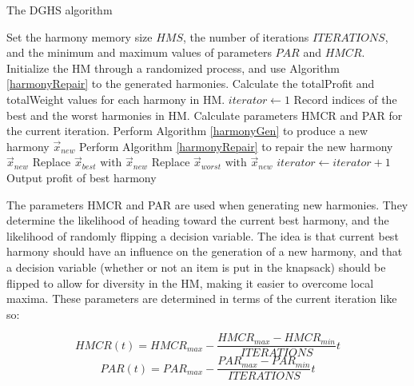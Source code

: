 \documentclass[titlepage]{article}
\begin{document}
\vskip 0.5cm
\begin{breakablealgorithm}
\caption{The DGHS algorithm}\label{DGHS}
    \begin{algorithmic}[1]
        \State Set the harmony memory size $HMS$, the number of iterations $ITERATIONS$, and the minimum and maximum values of parameters $PAR$ and $HMCR$.
        \State Initialize the HM through a randomized process, and use Algorithm \ref{harmonyRepair} to the generated harmonies. Calculate the totalProfit and totalWeight values for each harmony in HM.
        \State $iterator \gets 1$
            \State Record indices of the best and the worst harmonies in HM.
            \State Calculate parameters HMCR and PAR for the current iteration.
            \State Perform Algorithm \ref{harmonyGen} to produce a new harmony $\Vec{x}_{new}$
            \State Perform Algorithm \ref{harmonyRepair} to repair the new harmony $\Vec{x}_{new}$
                \State Replace $\Vec{x}_{best} \text{ with } \Vec{x}_{new}$
                \State Replace $\Vec{x}_{worst} \text{ with } \Vec{x}_{new}$
            \EndIf
            \State $iterator \gets iterator+1$
        \EndWhile
        \State Output profit of best harmony
    \end{algorithmic}
\end{breakablealgorithm}
\vskip 0.5cm

The parameters HMCR and PAR are used when generating new harmonies. They determine the likelihood of heading toward the current best harmony, and the likelihood of randomly flipping a decision variable. The idea is that current best harmony should have an influence on the generation of a new harmony, and that a decision variable (whether or not an item is put in the knapsack) should be flipped to allow for diversity in the HM, making it easier to overcome local maxima. These parameters are determined in terms of the current iteration like so:

\begin{equation}
    HMCR(t) = HMCR_{max} - \frac{HMCR_{max}-HMCR_{min}}{ITERATIONS} t
\end{equation}
\begin{equation}
    PAR(t) = PAR_{max} - \frac{PAR_{max}-PAR_{min}}{ITERATIONS} t
\end{equation}
\end{document}
